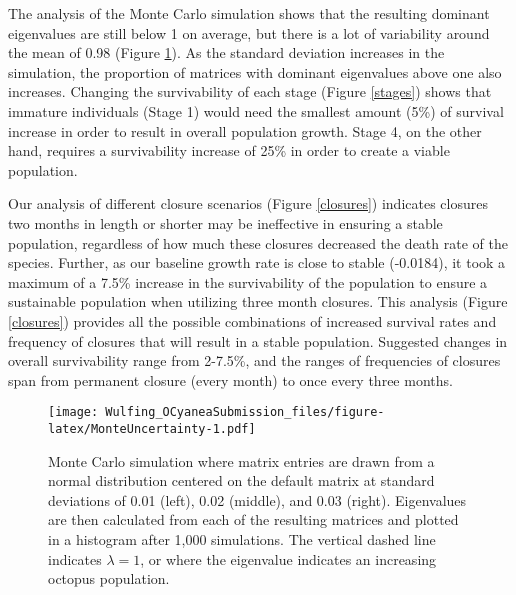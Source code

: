 \documentclass[
]{article}
\begin{document}
The analysis of the Monte Carlo simulation shows that the resulting dominant eigenvalues are still below 1 on average, but there is a lot of variability around the mean of 0.98 (Figure \ref{MonteUncertainty}). As the standard deviation increases in the simulation, the proportion of matrices with dominant eigenvalues above one also increases. Changing the survivability of each stage (Figure \ref{stages}) shows that immature individuals (Stage 1) would need the smallest amount (5\%) of survival increase in order to result in overall population growth. Stage 4, on the other hand, requires a survivability increase of 25\% in order to create a viable population.

Our analysis of different closure scenarios (Figure \ref{closures}) indicates closures two months in length or shorter may be ineffective in ensuring a stable population, regardless of how much these closures decreased the death rate of the species. Further, as our baseline growth rate is close to stable (-0.0184), it took a maximum of a 7.5\% increase in the survivability of the population to ensure a sustainable population when utilizing three month closures. This analysis (Figure \ref{closures}) provides all the possible combinations of increased survival rates and frequency of closures that will result in a stable population. Suggested changes in overall survivability range from 2-7.5\%, and the ranges of frequencies of closures span from permanent closure (every month) to once every three months.





\begin{figure}
\centering
\texttt{[image: Wulfing\_OCyaneaSubmission\_files/figure-latex/MonteUncertainty-1.pdf]}
\caption{\label{fig:MonteUncertainty}Monte Carlo simulation where matrix entries are drawn from a normal distribution centered on the default matrix at standard deviations of 0.01 (left), 0.02 (middle), and 0.03 (right). Eigenvalues are then calculated from each of the resulting matrices and plotted in a histogram after 1,000 simulations. The vertical dashed line indicates \(\lambda = 1\), or where the eigenvalue indicates an increasing octopus population. \label{MonteUncertainty}}
\end{figure}
\end{document}
